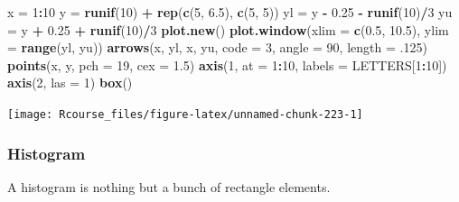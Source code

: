 \documentclass[]{book}
\newenvironment{Shaded}{\begin{snugshade}}{\end{snugshade}}
\newcommand{\KeywordTok}[1]{\textcolor[rgb]{0.13,0.29,0.53}{\textbf{#1}}}
\newcommand{\DataTypeTok}[1]{\textcolor[rgb]{0.13,0.29,0.53}{#1}}
\newcommand{\DecValTok}[1]{\textcolor[rgb]{0.00,0.00,0.81}{#1}}
\newcommand{\FloatTok}[1]{\textcolor[rgb]{0.00,0.00,0.81}{#1}}
\newcommand{\StringTok}[1]{\textcolor[rgb]{0.31,0.60,0.02}{#1}}
\newcommand{\OperatorTok}[1]{\textcolor[rgb]{0.81,0.36,0.00}{\textbf{#1}}}
\newcommand{\NormalTok}[1]{#1}
\theoremstyle{definition}
\theoremstyle{definition}
\theoremstyle{definition}
\theoremstyle{remark}
\begin{document}
\begin{Shaded}
\begin{Highlighting}[]
\NormalTok{x =}\StringTok{ }\DecValTok{1}\OperatorTok{:}\DecValTok{10}
\NormalTok{y =}\StringTok{ }\KeywordTok{runif}\NormalTok{(}\DecValTok{10}\NormalTok{) }\OperatorTok{+}\StringTok{ }\KeywordTok{rep}\NormalTok{(}\KeywordTok{c}\NormalTok{(}\DecValTok{5}\NormalTok{, }\FloatTok{6.5}\NormalTok{), }\KeywordTok{c}\NormalTok{(}\DecValTok{5}\NormalTok{, }\DecValTok{5}\NormalTok{))}
\NormalTok{yl =}\StringTok{ }\NormalTok{y }\OperatorTok{-}\StringTok{ }\FloatTok{0.25} \OperatorTok{-}\StringTok{ }\KeywordTok{runif}\NormalTok{(}\DecValTok{10}\NormalTok{)}\OperatorTok{/}\DecValTok{3}
\NormalTok{yu =}\StringTok{ }\NormalTok{y }\OperatorTok{+}\StringTok{ }\FloatTok{0.25} \OperatorTok{+}\StringTok{ }\KeywordTok{runif}\NormalTok{(}\DecValTok{10}\NormalTok{)}\OperatorTok{/}\DecValTok{3}
\KeywordTok{plot.new}\NormalTok{()}
\KeywordTok{plot.window}\NormalTok{(}\DataTypeTok{xlim =} \KeywordTok{c}\NormalTok{(}\FloatTok{0.5}\NormalTok{, }\FloatTok{10.5}\NormalTok{), }\DataTypeTok{ylim =} \KeywordTok{range}\NormalTok{(yl, yu))}
\KeywordTok{arrows}\NormalTok{(x, yl, x, yu, }\DataTypeTok{code =} \DecValTok{3}\NormalTok{, }\DataTypeTok{angle =} \DecValTok{90}\NormalTok{, }\DataTypeTok{length =}\NormalTok{ .}\DecValTok{125}\NormalTok{)}
\KeywordTok{points}\NormalTok{(x, y, }\DataTypeTok{pch =} \DecValTok{19}\NormalTok{, }\DataTypeTok{cex =} \FloatTok{1.5}\NormalTok{)}
\KeywordTok{axis}\NormalTok{(}\DecValTok{1}\NormalTok{, }\DataTypeTok{at =} \DecValTok{1}\OperatorTok{:}\DecValTok{10}\NormalTok{, }\DataTypeTok{labels =}\NormalTok{ LETTERS[}\DecValTok{1}\OperatorTok{:}\DecValTok{10}\NormalTok{])}
\KeywordTok{axis}\NormalTok{(}\DecValTok{2}\NormalTok{, }\DataTypeTok{las =} \DecValTok{1}\NormalTok{)}
\KeywordTok{box}\NormalTok{()}
\end{Highlighting}
\end{Shaded}

\texttt{[image: Rcourse\_files/figure-latex/unnamed-chunk-223-1]}

\subsubsection{Histogram}\label{histogram}

A histogram is nothing but a bunch of rectangle elements.
\end{document}
